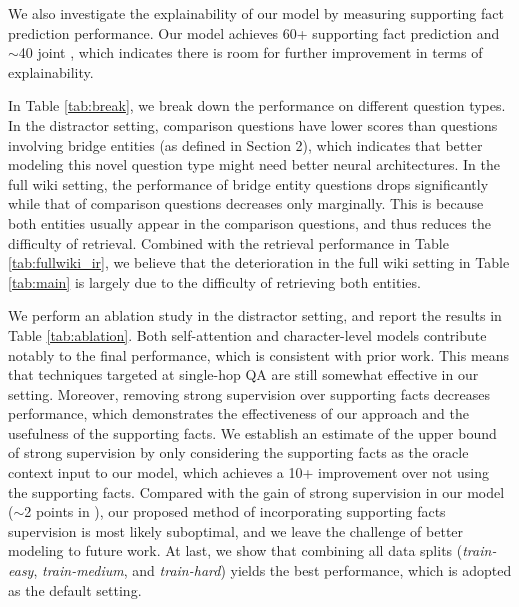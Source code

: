 We also investigate the explainability of our model by measuring supporting fact prediction performance.
Our model achieves 60+ supporting fact prediction \fone{} and $\sim$40 joint \fone{}, which indicates there is room for further improvement in terms of explainability.


In Table \ref{tab:break}, we break down the performance on different question types.
In the distractor setting, comparison questions have lower \fone{} scores than questions involving bridge entities (as defined in Section 2), which indicates that better modeling this novel question type might need better neural architectures.
In the full wiki setting, the performance of bridge entity questions drops significantly while that of comparison questions decreases only marginally.
This is because both entities usually appear in the comparison questions, and thus reduces the difficulty of retrieval.
Combined with the retrieval performance in Table \ref{tab:fullwiki_ir}, we believe that the deterioration in the full wiki setting in Table \ref{tab:main} is largely due to the difficulty of retrieving both entities.

We perform an ablation study in the distractor setting, and report the results in Table \ref{tab:ablation}.
Both self-attention and character-level models contribute notably to the final performance, which is consistent with prior work.
This means that techniques targeted at single-hop QA are still somewhat effective in our setting.
Moreover, removing strong supervision over supporting facts decreases performance, which demonstrates the effectiveness of our approach and the usefulness of the supporting facts.
We establish an estimate of the upper bound of strong supervision by only considering the supporting facts as the oracle context input to our model, which achieves a 10+ \fone{} improvement over not using the supporting facts.
Compared with the gain of strong supervision in our model ($\sim$2 points in \fone{}), our proposed method of incorporating supporting facts supervision is most likely suboptimal, and we leave the challenge of better modeling to future work.
At last, we show that combining all data splits (\textit{train-easy}, \textit{train-medium}, and \textit{train-hard}) yields the best performance, which is adopted as the default setting.

